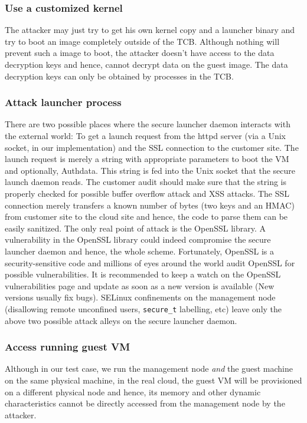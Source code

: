 \documentclass[10pt,twocolumn,pdftex]{article}
\begin{document}
\subsubsection{Use a customized kernel}
The attacker may just try to get his own kernel copy and a launcher binary and try to boot an image completely outside of the TCB. Although nothing will prevent such a image to boot, the attacker doesn't have access to the data decryption keys and hence, cannot decrypt data on the guest image. The data decryption keys can only be obtained by processes in the TCB.

\subsubsection{Attack launcher process}
There are two possible places where the secure launcher daemon interacts with the external world: To get a launch request from the httpd server (via a Unix socket, in our implementation) and the SSL connection to the customer site. The launch request is merely a string with appropriate parameters to boot the VM and optionally, Authdata. This string is fed into the Unix socket that the secure launch daemon reads. The customer audit should make sure that the string is properly checked for possible buffer overflow attack and XSS attacks. The SSL connection merely transfers a known number of bytes (two keys and an HMAC) from customer site to the cloud site and hence, the code to parse them can be easily sanitized. The only real point of attack is the OpenSSL library. A vulnerability in the OpenSSL library could indeed compromise the secure launcher daemon and hence, the whole scheme. Fortunately, OpenSSL is a security-sensitive code and millions of eyes around the world audit OpenSSL for possible vulnerabilities. It is recommended to keep a watch on the OpenSSL vulnerabilities page \cite{openssl-vulnerabilities} and update as soon as a new version is available (New versions usually fix bugs). 
SELinux confinements on the management node (disallowing remote unconfined users, {\tt secure\_t} labelling, etc) leave only the above two possible attack alleys on the secure launcher daemon.

\subsubsection{Access running guest VM}
Although in our test case, we run the management node \emph{and} the guest machine on the same physical machine, in the real cloud, the guest VM will be provisioned on a different physical node and hence, its memory and other dynamic characteristics cannot be directly accessed from the management node by the attacker.
\end{document}
